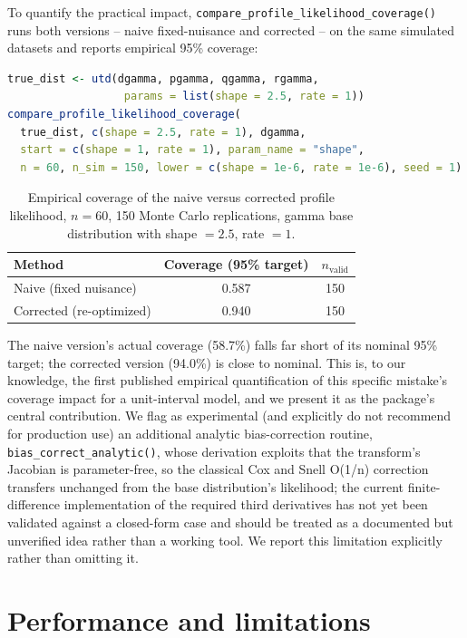 \documentclass[11pt]{article}
\begin{document}
To quantify the practical impact,
\texttt{compare\_profile\_likelihood\_coverage()} runs both versions --
naive fixed-nuisance and corrected -- on the same simulated datasets and
reports empirical 95\% coverage:

\begin{lstlisting}[language=R]
true_dist <- utd(dgamma, pgamma, qgamma, rgamma,
                  params = list(shape = 2.5, rate = 1))
compare_profile_likelihood_coverage(
  true_dist, c(shape = 2.5, rate = 1), dgamma,
  start = c(shape = 1, rate = 1), param_name = "shape",
  n = 60, n_sim = 150, lower = c(shape = 1e-6, rate = 1e-6), seed = 1)
\end{lstlisting}

\begin{table}[h]
\centering
\begin{tabular}{@{}lcc@{}}
\toprule
Method & Coverage (95\% target) & $n_{\text{valid}}$ \\
\midrule
Naive (fixed nuisance) & 0.587 & 150 \\
Corrected (re-optimized) & 0.940 & 150 \\
\bottomrule
\end{tabular}
\caption{Empirical coverage of the naive versus corrected profile
likelihood, $n=60$, 150 Monte Carlo replications, gamma base
distribution with shape $=2.5$, rate $=1$.}
\label{tab:coverage}
\end{table}

The naive version's actual coverage (58.7\%) falls far short of its
nominal 95\% target; the corrected version (94.0\%) is close to
nominal. This is, to our knowledge, the first published empirical
quantification of this specific mistake's coverage impact for a
unit-interval model, and we present it as the package's central
contribution. We flag as experimental (and explicitly do not recommend
for production use) an additional analytic bias-correction routine,
\texttt{bias\_correct\_analytic()}, whose derivation exploits that the
transform's Jacobian is parameter-free, so the classical Cox and Snell
O(1/n) correction \citep{coxsnell1968} transfers unchanged from the base
distribution's likelihood; the current finite-difference implementation
of the required third derivatives has not yet been validated against a
closed-form case and should be treated as a documented but unverified
idea rather than a working tool. We report this limitation explicitly
rather than omitting it.

\section{Performance and limitations}
\end{document}

